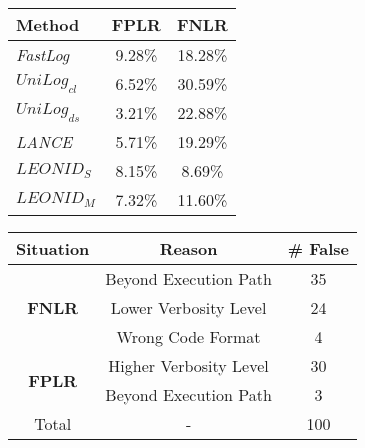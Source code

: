 \begin{table*}[htbp]
\centering
\begin{minipage}{0.48\textwidth}
\centering
\caption{False Positive and False Negative Logging Rates across Methods. \textbf{FPLR} means the predicted log statement record logs when it should not, and \textbf{FNLR} means the predicted log statement does not record logs when it should.}
\label{tab:table_FPLG_FNLG}
\setlength{\tabcolsep}{8pt} %
\begin{tabular}{lcc}
    \toprule
    \textbf{Method} & \textbf{FPLR} & \textbf{FNLR} \\
    \midrule
        \textit{FastLog} & 9.28\% & 18.28\% \\
        \(UniLog_{{cl}}\)  &	6.52\% &	30.59\% \\
        \(UniLog_{{ds}}\)  &	3.21\% &	 22.88\%\\
    \textit{LANCE}   & 5.71\% & 19.29\% \\
    \(LEONID_S\) &	8.15\% & 8.69\% \\
        \(LEONID_M\)  &	7.32\% & 11.60\% \\
    \bottomrule
\end{tabular}
\end{minipage}\hfill
\begin{minipage}{0.48\textwidth}
\centering
\caption{\textbf{FPLR} and \textbf{FNLR} Reason Analysis. For FNLR, the major reason is beyond the execution path, and for FPLR, the major reason is lower verbosity level.}
\label{tab:table_FPLG_FNLG_Reason}
\centering
\setlength\tabcolsep{12pt}  %
\renewcommand{\arraystretch}{1.1}  %
\scalebox{0.8} {  %
\begin{tabular}{c|c|c}
    \toprule
\textbf{Situation} & \textbf{Reason} & \textbf{\# False} \\     \midrule
\multirow{3}{*}{\textbf{FNLR}}& Beyond Execution Path & 35  \\ 
& Lower Verbosity Level & 24\\ 
& Wrong Code Format & 4 \\ \midrule
\multirow{2}{*}{\textbf{FPLR}} & Higher Verbosity Level & 30 \\ 
& Beyond Execution Path & 3 \\    \midrule
Total & -  & 100 \\
\bottomrule
\end{tabular}
}
\end{minipage}
\end{table*}
